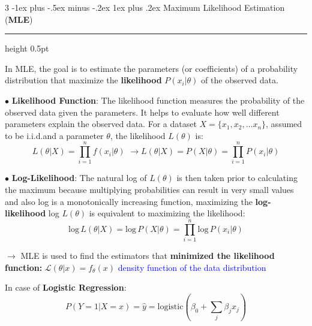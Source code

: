 \documentclass[letterpaper, 10.5pt,landscape]{article}
\makeatletter
\renewcommand{\subsubsection}{\@startsection{subsubsection}{3}{0mm}%
                                {-1ex plus -.5ex minus -.2ex}%
                                {1ex plus .2ex}%
                                {\normalfont\small\bfseries}}
\makeatother
\begin{document}
\begin{multicols*}{3}
\vspace{2pt}
\subsubsection{Maximum Likelihood Estimation (\textbf{MLE})} {\color{teal}\hrule height 0.5pt} \smallskip
In MLE, the goal is to estimate the parameters (or coefficients) of a probability distribution that maximize the \textbf{likelihood} $P(x_{i}|\theta)$ of the observed data.

\vspace{3pt}
$\bullet$ \textbf{Likelihood Function}: The likelihood function measures the probability of the observed data given the parameters. It helps to evaluate how well different parameters explain the observed data.
For a dataset \(X = \{x_{1}, x_{2}, ... {x_n} \}\), assumed to be i.i.d.and a parameter $\theta$, the likelihood \(L(\theta)\) is: 
\vspace{-3pt}
\[\boxed{L\left(\theta | X \right) = \prod^{n}_{i=1} f\left(x_{i}|\theta \right) \hspace{4pt} \rightarrow L\left(\theta | X \right) = P\left(X | \theta \right) =  \prod^{n}_{i=1} P\left(x_{i}|\theta \right) }   \]

$\bullet$\textbf{ Log-Likelihood}:
The natural log of $L(\theta)$ is then taken prior to calculating the maximum because multiplying probabilities can result in very small values and also log is a monotonically increasing function, maximizing the \textbf{log-likelihood} log $L(\theta)$ is equivalent to maximizing the likelihood:
\vspace{-3pt}
\[\boxed{\text{log} \hspace{2pt} L\left(\theta | X \right) = \text{log} \hspace{2pt} P\left(X | \theta \right) =  \prod^{n}_{i=1} \text{log} \hspace{2pt} P\left(x_{i}|\theta \right) }   \]




$\rightarrow$ MLE is used to find the estimators that \textbf{minimized the likelihood function:} 
\(\mathcal{L}(\theta|x) = f_{\theta}(x) \) \hspace{5pt} \textcolor{blue}{density function of the data distribution}



\vspace{3pt}



In case of \textbf{Logistic Regression}:
\vspace{-10pt}
\[P\left(Y=1 | X=x \right) = \hat{y} = \text{logistic} \left(\beta_{0} + \sum_{j} \beta_{j}x_{j} \right)  \]
\vspace{-12pt}


\end{multicols*}
\end{document}

